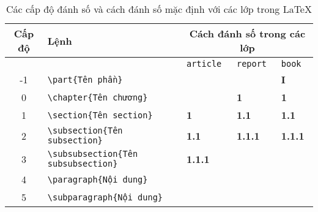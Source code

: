 \documentclass[12pt,a4paper]{article}
\newcommand{\head}[1]{\textbf{#1}}
\begin{document}
\begin{table}[h]
  \begin{center}
    \begin{tabular}{cllll}\toprule
      \head{Cấp độ} & \head{Lệnh}                              & \multicolumn{3}{c}{\head{Cách đánh số trong các lớp}}                                   \\ \midrule
                    &                                          & \Verb|article|                                        & \Verb|report|  & \Verb|book|    \\ \midrule
      -1            & \Verb|\part{Tên phần}|                   &                                                       &                & \textbf{I}     \\ \midrule
      0             & \Verb|\chapter{Tên chương}|              &                                                       & \textbf{1}     & \textbf{1}     \\ \midrule
      1             & \Verb|\section{Tên section}|             & \textbf{1}                                            & \textbf{1.1}   & \textbf{1.1}   \\ \midrule
      2             & \Verb|\subsection{Tên subsection}|       & \textbf{1.1}                                          & \textbf{1.1.1} & \textbf{1.1.1} \\ \midrule
      3             & \Verb|\subsubsection{Tên subsubsection}| & \textbf{1.1.1}                                        &                &                \\ \midrule
      4             & \Verb|\paragraph{Nội dung}|              &                                                       &                &                \\ \midrule
      5             & \Verb|\subparagraph{Nội dung}|           &                                                       &                &                \\ \bottomrule
    \end{tabular}
  \end{center}
  \caption{Các cấp độ đánh số và cách đánh số mặc định với các lớp trong \LaTeX} \label{Tab:7cap-danhso}
\end{table}
\end{document}
